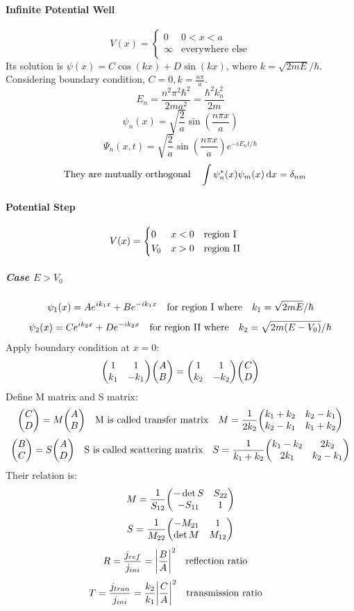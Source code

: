 \documentclass[a4paper,10pt]{article}
\begin{document}
\paragraph{Infinite Potential Well}
$$V(x)=\begin{cases}
        0      & 0<x<a                  \\
        \infty & \text{everywhere else}
    \end{cases}$$
Its solution is $\psi(x)=C\cos(kx)+D\sin(kx)$, where $k=\sqrt{2mE}/\hbar$. Considering boundary condition, $C=0,k=\frac{n\pi}{a}$.
$$E_n=\frac{n^2\pi^2\hbar^2}{2ma^2}=\frac{\hbar^2k_n^2}{2m}$$
$$\psi_n(x)=\sqrt{\frac{2}{a}}\sin\left(\frac{n\pi x}{a}\right)$$
$$\Psi_n(x,t)=\sqrt{\frac{2}{a}}\sin\left(\frac{n\pi x}{a}\right)e^{-iE_nt/\hbar}$$
$$\qq{They are mutually orthogonal}\int\psi_n^\ast(x)\psi_m(x)\dd{x}=\delta_{nm}$$
\paragraph{Potential Step}
$$V(x)=\begin{cases}
        0   & x<0\qq{region I}  \\
        V_0 & x>0\qq{region II}
    \end{cases}$$
\subparagraph{Case $E>V_0$}
$$\psi_1(x)=Ae^{ik_1x}+Be^{-ik_1x}\qq{for region I where}k_1=\sqrt{2mE}/\hbar$$
$$\psi_2(x)=Ce^{ik_2x}+De^{-ik_2x}\qq{for region II where}k_2=\sqrt{2m(E-V_0)}/\hbar$$
Apply boundary condition at $x=0$:
$$\mqty(1&1\\k_1&-k_1)\mqty(A\\B)=\mqty(1&1\\k_2&-k_2)\mqty(C\\D)$$
Define M matrix and S matrix:
$$\mqty(C\\D)=M\mqty(A\\B)\qq{M is called transfer matrix}M=\frac{1}{2k_2}\mqty(k_{1}+k_{2}&k_{2}-k_{1}\\k_{2}-k_{1}&k_{1}+k_{2})$$
$$\mqty(B\\C)=S\mqty(A\\D)\qq{S is called scattering matrix}S=\frac{1}{k_1+k_2}\mqty(k_{1}-k_{2}&2k_{2}\\2k_{1}&k_{2}-k_{1})$$
Their relation is:
$$M=\frac{1}{S_{12}}\mqty(-\det S&S_{22}\\-S_{11}&1)$$
$$S=\frac{1}{M_{22}}\mqty(-M_{21}&1\\\det M&M_{12})$$
$$R=\frac{j_{ref}}{j_{ini}}=\abs{\frac{B}{A}}^2\qq{reflection ratio}$$
$$T=\frac{j_{tran}}{j_{ini}}=\frac{k_2}{k_1}\abs{\frac{C}{A}}^2\qq{transmission ratio}$$
\end{document}
